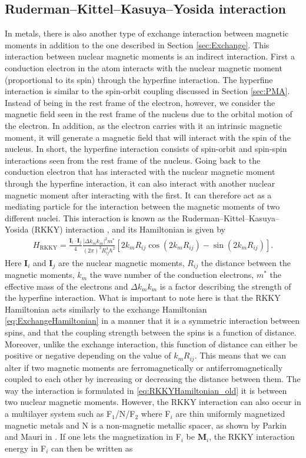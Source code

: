 \subsection{Ruderman--Kittel--Kasuya--Yosida interaction}
In metals, there is also another type of exchange interaction between magnetic moments in addition to the one described in Section \ref{sec:Exchange}. This interaction between nuclear magnetic moments is an indirect interaction. First a conduction electron in the atom interacts with the nuclear magnetic moment (proportional to its spin) through the hyperfine interaction. The hyperfine interaction is similar to the spin-orbit coupling discussed in Section \ref{sec:PMA}. Instead of being in the rest frame of the electron, however, we consider the magnetic field seen in the rest frame of the nucleus due to the orbital motion of the electron. In addition, as the electron carries with it an intrinsic magnetic moment, it will generate a magnetic field that will interact with the spin of the nucleus. In short, the hyperfine interaction consists of spin-orbit and spin-spin interactions seen from the rest frame of the nucleus. Going back to the conduction electron that has interacted with the nuclear magnetic moment through the hyperfine interaction, it can also interact with another nuclear magnetic moment after interacting with the first. It can therefore act as a mediating particle for the interaction between the magnetic moments of two different nuclei. This interaction is known as the Ruderman--Kittel--Kasuya--Yosida (RKKY) interaction \cite{RudermanKittel1954, Kasuya1956, Yosida1957, Vleck1962}, and its Hamiltonian is given by
\begin{align}
    \label{eq:RKKYHamiltonian_old}
    H_{\text{RKKY}} = \frac{\mathbold{I}_i\cdot\mathbold{I}_j}{4}\frac{|\Delta k_m k_m|^2m^*}{(2\pi)^3 R_{ij}^4 \hbar^2} \left[2k_mR_{ij}\cos\left(2k_mR_{ij}\right) - \sin \left(2k_mR_{ij}\right)\right].
\end{align}
Here $\mathbold{I}_i$ and $\mathbold{I}_j$ are the nuclear magnetic moments, $R_{ij}$ the distance between the magnetic moments, $k_m$ the wave number of the conduction electrons, $m^*$ the effective mass of the electrons and $\Delta k_m k_m$ is a factor describing the strength of the hyperfine interaction. What is important to note here is that the RKKY Hamiltonian acts similarly to the exchange Hamiltonian \eqref{eq:ExchangeHamiltonian} in a manner that it is a symmetric interaction between spins, and that the coupling strength between the spins is a function of distance. Moreover, unlike the exchange interaction, this function of distance can either be positive or negative depending on the value of $k_mR_{ij}$. This means that we can alter if two magnetic moments are ferromagnetically or antiferromagnetically coupled to each other by increasing or decreasing the distance between them. The way the interaction is formulated in \eqref{eq:RKKYHamiltonian_old} it is between two nuclear magnetic moments. However, the RKKY  interaction can also occur in a multilayer system such as F$_1$/N/F$_2$ where F$_i$ are thin uniformly magnetized magnetic metals and N is a non-magnetic metallic spacer, as shown by Parkin and Mauri in \cite{Parkin1991}. If one lets the magnetization in F$_i$ be $\mathbold{M}_i$, the RKKY interaction energy in F$_i$ can then be written as
